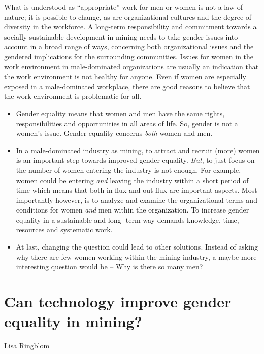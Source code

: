 \documentclass[
  12pt,
]{scrbook}
\newenvironment{chap-auth}
{\vspace{1cm}\begin{center}\begin{flushright}\sffamily\noindent}
  {\end{flushright}\end{center}\vspace{1cm}}
\begin{document}
What is understood as ``appropriate'' work for men or women is not a law of nature; it is possible to change, as are organizational cultures and the degree of diversity in the workforce. A long-term responsibility and commitment towards a socially sustainable development in mining needs to take gender issues into account in a broad range of ways, concerning both organizational issues and the gendered implications for the surrounding communities. Issues for women in the work environment in male-dominated organizations are usually an indication that the work environment is not healthy for anyone. Even if women are especially exposed in a male-dominated workplace, there are good reasons to believe that the work environment is problematic for all.

\begin{itemize}
\item
  Gender equality means that women and men have the same rights, responsibilities and opportunities in all areas of life. So, gender is not a women's issue. Gender equality concerns \emph{both} women and men.
\item
  In a male-dominated industry as mining, to attract and recruit (more) women is an important step towards improved gender equality. \emph{But}, to just focus on the number of women entering the industry is not enough. For example, women could be entering \emph{and} leaving the industry within a short period of time which means that both in-flux and out-flux are important aspects. Most importantly however, is to analyze and examine the organizational terms and conditions for women \emph{and} men within the organization. To increase gender equality in a sustainable and long- term way demands knowledge, time, resources and systematic work.
\item
  At last, changing the question could lead to other solutions. Instead of asking why there are few women working within the mining industry, a maybe more interesting question would be -- Why is there so many men?
\end{itemize}

\hypertarget{can-technology-improve-gender-equality-in-mining}{%
\chapter{Can technology improve gender equality in mining?}\label{can-technology-improve-gender-equality-in-mining}}

\begin{chap-auth}
Lisa Ringblom
\end{chap-auth}
\end{document}
